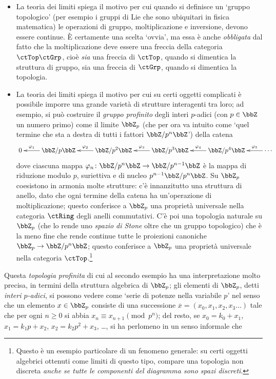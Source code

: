 \begin{itemize}
 \item La teoria dei limiti spiega il motivo per cui quando si definisce un `gruppo topologico' (per esempio i gruppi di Lie che sono ubiquitari in fisica matematica) le operazioni di gruppo, moltiplicazione e inversione, devono essere continue. È certamente una scelta `ovvia', ma essa è anche \emph{obbligata} dal fatto che la moltiplicazione deve essere una freccia della categoria \(\ctTop\ctGrp\), cioè \emph{sia} una freccia di \(\ctTop\), quando si dimentica la struttura di gruppo, sia una freccia di \(\ctGrp\), quando si dimentica la topologia.
 \item La teoria dei limiti spiega il motivo per cui su certi oggetti complicati è possibile imporre una grande varietà di strutture interagenti tra loro; ad esempio, si può costruire il \emph{gruppo profinito} degli interi \(p\)-adici (con \(p\in\bbZ\) un numero primo) come il limite \(\bbZ_p\) (che per ora va intuito come `quel termine che sta a destra di tutti i fattori \(\bbZ/p^n\bbZ\)') della catena
       \[\xymatrix{
        0 & \ar[l]_-{\varphi_1} \bbZ/p\bbZ & \bbZ/p^2\bbZ \ar[l]_-{\varphi_2} & \bbZ/p^3\bbZ \ar[l]_-{\varphi_3} & \bbZ/p^4\bbZ \ar[l]_-{\varphi_4} & \cdots \ar[l]_-{\varphi_5}
        }\]
       dove ciascuna mappa \(\varphi_n \colon \bbZ/p^n\bbZ \to \bbZ/p^{n-1}\bbZ\) è la mappa di riduzione modulo \(p\), suriettiva e di nucleo \(p^{n-1}\bbZ/p^n\bbZ\). Su \(\bbZ_p\) coesistono in armonia molte strutture: c'è innanzitutto una struttura di anello, dato che ogni termine della catena ha un'operazione di moltiplicazione; questo conferisce a \(\bbZ_p\) una proprietà universale nella categoria \(\ctRing\) degli anelli commutativi. C'è poi una topologia naturale su \(\bbZ_p\) (che lo rende uno \emph{spazio di Stone} oltre che un gruppo topologico) che è la meno fine che rende continue tutte le proiezioni canoniche \(\bbZ_p \to \bbZ/p^n\bbZ\); questo conferisce a \(\bbZ_p\) una proprietà universale nella categoria \(\ctTop\).\footnote{Questo è un esempio particolare di un fenomeno generale: su certi oggetti algebrici ottenuti come limiti di questo tipo, compare una topologia non discreta \emph{anche se tutte le componenti del diagramma sono spazi discreti}.}
      \end{itemize}
Questa \emph{topologia profinita} di cui al secondo esempio ha una interpretazione molto precisa, in termini della struttura algebrica di \(\bbZ_p\); gli elementi di \(\bbZ_p\), detti \emph{interi $p$-adici}, si possono vedere come `serie di potenze nella variabile \(p\)' nel senso che un elemento \(x\in\bbZ_p\) consiste di una successione \(\overline x = (x_0,x_1,x_2,x_3\dots)\) tale che per ogni \(n\ge 0\) si abbia \(x_n\equiv x_{n+1}\pmod{p^n}\); del resto, se \(x_0 = k_0+x_1\), \(x_1 = k_1p+x_2\), \(x_2 = k_2p^2+x_3\), \dots, si ha perlomeno in un senso informale che
